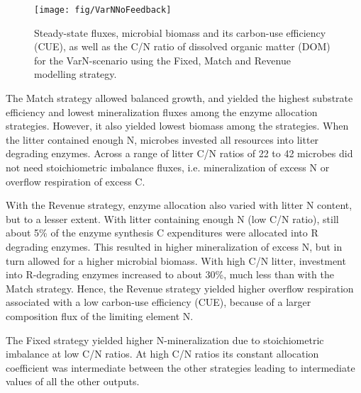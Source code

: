 \begin{figure}[t] \vspace*{2mm}
\begin{center}
\texttt{[image: fig/VarNNoFeedback]}
\end{center}
\caption{
Steady-state fluxes, microbial biomass and its carbon-use efficiency (CUE), as well as the C/N ratio of dissolved organic matter (DOM) for the VarN-scenario using the Fixed, Match and Revenue modelling strategy.
\label{fig:VarNNoFeedback}}
\end{figure}


The Match strategy allowed balanced growth, and yielded the highest substrate
efficiency and lowest mineralization fluxes among the enzyme allocation
strategies. However, it also yielded lowest biomass among the strategies. When
the litter contained enough N, microbes invested all resources into litter
degrading enzymes.
Across a range of litter C/N ratios of 22 to 42 microbes did not need
stoichiometric imbalance fluxes, i.e. mineralization of excess N or overflow
respiration of excess C.

With the Revenue strategy, enzyme allocation also varied with litter N content,
but to a lesser extent.
With litter containing enough N (low C/N ratio), still about 5\% of the enzyme
synthesis C expenditures were allocated into R degrading enzymes. This resulted
in higher mineralization of excess N, but in turn allowed for a higher microbial
biomass.
With high C/N litter, investment into R-degrading enzymes increased to about
30\%, much less than with the Match strategy. Hence, the Revenue strategy
yielded higher overflow respiration associated with a low carbon-use
efficiency (CUE), because of a larger composition flux of the limiting element
N.

The Fixed strategy yielded higher N-mineralization due to stoichiometric
imbalance at low C/N ratios.
At high C/N ratios its constant allocation coefficient was intermediate between
the other strategies leading to intermediate values of all the other outputs.


